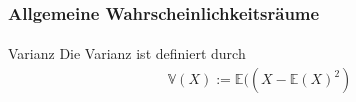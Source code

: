 \documentclass{beamer}
\begin{document}
\begin{frame}
    \frametitle{Allgemeine Wahrscheinlichkeitsräume}
\framesubtitle{}

\begin{block}{Varianz}
Die Varianz ist definiert durch
\begin{align*}
\mathbb{V}(X) :=\mathbb{E}( (X - \mathbb{E}(X)^2 )
\end{align*}
\end{block}

 \end{frame}
\end{document}
